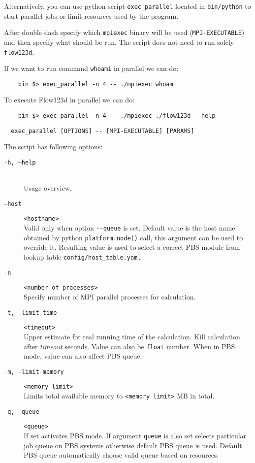 \documentclass[12pt,a4paper]{report}
\begin{document}
Alternatively, you can use python script \verb'exec_parallel' located in \verb'bin/python' to start parallel jobs or limit resources used by the program.

After double dash specify which \verb'mpiexec' binary will be used (\verb'MPI-EXECUTABLE') and then specify what should be run. 
The script does not need to run solely \verb'flow123d'.

If we want to run command \verb'whoami' in parallel we can do:
\begin{verbatim}
	bin $> exec_parallel -n 4 -- ./mpiexec whoami
\end{verbatim}

To execute Flow123d in parallel we can do:
\begin{verbatim}
	bin $> exec_parallel -n 4 -- ./mpiexec ./flow123d --help
\end{verbatim}


\begin{verbatim}
  exec_parallel [OPTIONS] -- [MPI-EXECUTABLE] [PARAMS]
\end{verbatim}

The script has following options:

\begin{description}
  \item[{\tt -h, --help}] \hfill\\
  	Usage overview.
  \item[{\tt --host}] \verb'<hostname>' \hfill\\
  		Valid only when option \verb'--queue' is set.
        Default value is the host name obtained by python \verb'platform.node()' call, this argument can be used to override it. 
        Resulting value is used to select a correct PBS module from lookup table \verb'config/host_table.yaml'.
  \item[{\tt -n}] \verb'<number of processes>' \hfill\\
  	Specify number of MPI parallel processes for calculation.
  \item[{\tt -t, --limit-time}] \verb'<timeout>' \hfill\\
  	Upper estimate for real running time of the calculation. Kill calculation after {\it timeout} seconds. 
  	Value can also be \verb'float' number. When in PBS mode, value can also affect PBS queue. 
  \item[{\tt -m, --limit-memory}] \verb'<memory limit>' \hfill\\
  	Limits total available memory to \verb'<memory limit>' MB in total.
  \item[{\tt -q, --queue}] \verb'<queue>' \hfill\\
  		If set activates PBS mode. If argument \verb'queue' is also set selects particular job queue
  		on PBS systems otherwise default PBS queue is used. Default PBS queue automatically
  		choose valid queue based on resources.
\end{description}
\end{document}

